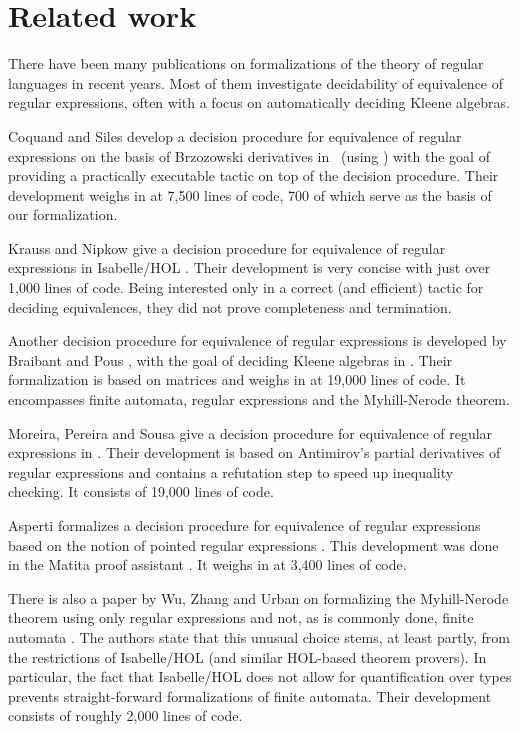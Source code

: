 \section{Related work}

There have been many publications on formalizations of the theory of regular languages in recent years.
Most of them investigate decidability of equivalence of regular expressions, often with a focus on automatically deciding Kleene algebras.


Coquand and Siles develop a decision procedure for equivalence of regular expressions \cite{DBLP:conf/cpp/CoquandS11} on the basis of Brzozowski derivatives \cite{DBLP:journals/jacm/Brzozowski64} in \coq\ (using \ssreflect) with the goal of providing a practically executable tactic on top of the decision procedure. 
Their development weighs in at 7,500 lines of code, 700 of which serve as the basis of our formalization.


Krauss and Nipkow give a decision procedure for equivalence of regular expressions in Isabelle/HOL \cite{DBLP:journals/jar/KraussN12}. 
Their development is very concise with just over 1,000 lines of code. 
Being interested only in a correct (and efficient) tactic for deciding equivalences, they did not prove completeness and termination. 


Another decision procedure for equivalence of regular expressions is developed by Braibant and Pous \cite{DBLP:journals/corr/abs-1105-4537}, with the goal of deciding Kleene algebras in \coq. Their formalization is based on matrices and weighs in at 19,000 lines of code. It encompasses finite automata, regular expressions and the Myhill-Nerode theorem.


Moreira, Pereira and Sousa give a decision procedure for equivalence of regular expressions in \coq \cite{DBLP:conf/RelMiCS/MoreiraPS12}.
Their development is based on Antimirov's partial derivatives of regular expressions \cite{DBLP:journals/tcs/Antimirov96} and contains a refutation step to speed up inequality checking. It consists of 19,000 lines of code.


Asperti formalizes a decision procedure for equivalence of regular expressions \cite{DBLP:conf/itp/Asperti12} based on the notion of pointed regular expressions \cite{DBLP:journals/corr/abs-1010-2604}. This development was done in the Matita proof assistant \cite{DBLP:conf/cade/AspertiRCT11}. It weighs in at 3,400 lines of code.


There is also a paper by Wu, Zhang and Urban on formalizing the Myhill-Nerode theorem using only regular expressions and not, as is commonly done, finite automata \cite{DBLP:conf/itp/WuZU11}.
The authors state that this unusual choice stems, at least partly, from the restrictions of Isabelle/HOL (and similar HOL-based theorem provers). 
In particular, the fact that Isabelle/HOL does not allow for quantification over types prevents straight-forward formalizations of finite automata.
Their development consists of roughly 2,000 lines of code.


